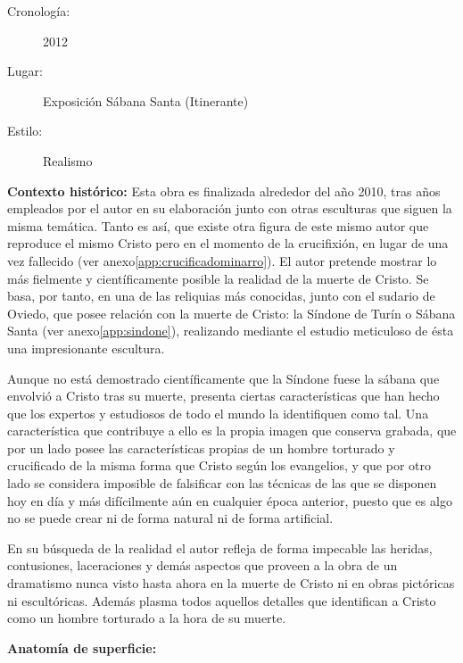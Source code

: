 \newpage

\begin{description}
\item[Cronología:] 2012
\item[Lugar:] Exposición Sábana Santa (Itinerante)
\item[Estilo:] Realismo
\end{description}

\textbf{Contexto histórico:} Esta obra es finalizada alrededor del año 2010, tras años empleados por el autor en su elaboración junto con otras esculturas que siguen la misma temática. Tanto es así, que existe otra figura de este mismo autor que reproduce el mismo Cristo pero en el momento de la crucifixión, en lugar de una vez fallecido (ver anexo\autoref{app:crucificadominarro}). El autor pretende mostrar lo más fielmente y científicamente posible la realidad de la muerte de Cristo. Se basa, por tanto, en una de las reliquias más conocidas, junto con el sudario de Oviedo, que posee relación con la muerte de Cristo: la Síndone de Turín o Sábana Santa (ver anexo\autoref{app:sindone}), realizando mediante el estudio meticuloso de ésta una impresionante escultura.

Aunque no está demostrado científicamente que la Síndone fuese la sábana que envolvió a Cristo tras su muerte, presenta ciertas características que han hecho que los expertos y estudiosos de todo el mundo la identifiquen como tal. Una característica que contribuye a ello es la propia imagen que conserva grabada, que por un lado posee las características propias de un hombre torturado y crucificado de la misma forma que Cristo según los evangelios, y que por otro lado se considera imposible de falsificar con las técnicas de las que se disponen hoy en día y más difícilmente aún en cualquier época anterior, puesto que es algo no se puede crear ni de forma natural ni de forma artificial.

En su búsqueda de la realidad el autor refleja de forma impecable las heridas, contusiones, laceraciones y demás aspectos que proveen a la obra de un dramatismo nunca visto hasta ahora en la muerte de Cristo ni en obras pictóricas ni escultóricas. Además plasma todos aquellos detalles que identifican a Cristo como un hombre torturado a la hora de su muerte.

\vspace{12pt}
\textbf{Anatomía de superficie:}

